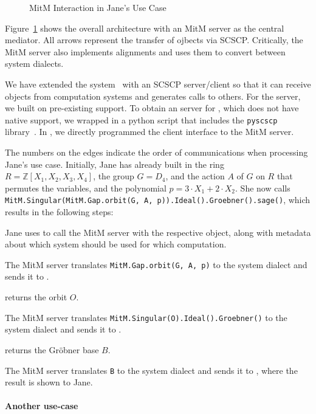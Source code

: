 \begin{figure}[ht]\centering
  \caption{MitM Interaction in Jane's Use Case}\label{fig:mitmpoc}
\end{figure}

Figure~\ref{fig:mitmpoc} shows the overall architecture with an MitM server as the central mediator.
All arrows represent the transfer of \OMMT ojbects via SCSCP.
Critically, the MitM server also implements alignments and uses them to convert between system dialects.

We have extended the \MMT system~\cite{Rabe:MAGMS13} with an SCSCP server/client so that it can receive objects from computation systems and generates calls to others.
For the \GAP server, we built on pre-existing \SCSCP support.
To obtain an \SCSCP server for \Singular, which does not have native \SCSCP support, we wrapped \Singular in a python script that includes the \lstinline|pyscscp| library~\cite{py-scscp:on}.
In \Sage, we directly programmed the client interface to the MitM server.

The numbers on the edges indicate the order of communications when processing Jane's use case.
Initially, Jane has already built in \Sage the ring $R=\mathbb{Z}[X_1,X_2,X_3,X_4]$, the group $G=D_4$, and the action $A$ of $G$ on $R$ that permutes the variables, and the polynomial $p = 3\cdot X_1 + 2\cdot X_2$.
She now calls \lstinline|MitM.Singular(MitM.Gap.orbit(G, A, p)).Ideal().Groebner().sage()|, which results in the following steps:
\begin{compactenum}
  \item Jane uses \Sage to call the MitM server with the respective \Sage object, along with metadata about which system should be used for which computation.
  \item The MitM server translates \lstinline|MitM.Gap.orbit(G, A, p)| to the \GAP system dialect and sends it to \GAP.
  \item \GAP returns the orbit $O$.
  \item The MitM server translates \lstinline|MitM.Singular(O).Ideal().Groebner()| to the \Singular system dialect and sends it to \Singular.
  \item \Singular returns the Gröbner base $B$.
  \item The MitM server translates \lstinline|B| to the \Sage system dialect and sends it to \Sage, where the result is shown to Jane.
\end{compactenum}

\paragraph{Another use-case}

